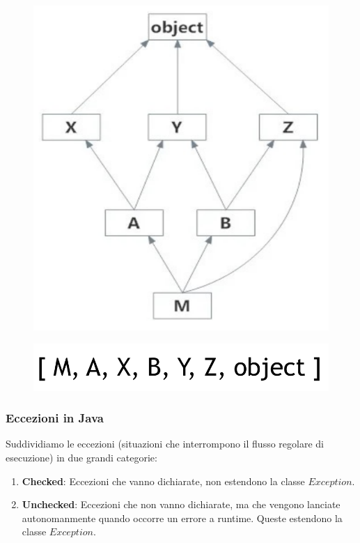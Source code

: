 \documentclass{article}
\begin{document}
\begin{enumerate}
    \begin{figure}[htbp]
        \center
        \includegraphics[scale=0.28]{img/albero_gerarchia.png}
    \end{figure}

    \begin{figure}[htbp]
        \center
        \includegraphics[scale=0.28]{img/albero_gerarchia1.png}
    \end{figure}
    
\end{enumerate}

\subsubsection{Eccezioni in Java}

Suddividiamo le eccezioni (situazioni che interrompono il flusso regolare di esecuzione) in due grandi categorie:

\begin{enumerate}
    \item \textbf{Checked}: Eccezioni che vanno dichiarate, non estendono la classe $Exception$.
    \item \textbf{Unchecked}: Eccezioni che non vanno dichiarate, ma che vengono lanciate autonomanmente quando occorre un errore a runtime. Queste estendono la classe $Exception$.
\end{enumerate}
\end{document}
